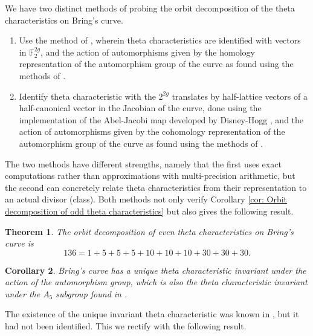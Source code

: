 \documentclass{amsart}
\newtheorem{theorem}{Theorem}[section]
\newtheorem{corollary}[theorem]{Corollary}
\begin{document}
We have two distinct methods of probing the orbit decomposition of the theta characteristics on Bring's curve.
\begin{enumerate}
    \item Use the method of \cite{Kallel2006}, wherein theta characteristics are identified with vectors in $\mathbb{F}_2^{2g}$, and the action of automorphisms given by the homology representation of the automorphism group of the curve as found using the methods of \cite{Bruin2019}. 
    \item Identify theta characteristic with the $2^{2g}$ translates by half-lattice vectors of a half-canonical vector in the Jacobian of the curve, done using the implementation of the Abel-Jacobi map developed by Disney-Hogg \cite{DisneyHogg2021}, and the action of automorphisms given by the cohomology representation of the automorphism group of the curve as found using the methods of \cite{Bruin2019}.
\end{enumerate}
The two methods have different strengths, namely that the first uses exact computations rather than approximations with multi-precision arithmetic, but the second can concretely relate theta characteristics from their representation to an actual divisor (class). Both methods not only verify Corollary \ref{cor: Orbit decomposition of odd theta characteristics} but also gives the following result. 
\begin{theorem}
The orbit decomposition of even theta characteristics on Bring's curve is 
\begin{equation}\label{eq:evencharacteristics}
136 = 1 + 5+5+5+10+10+10+30+30+30  . 
\end{equation}
\end{theorem}
\begin{corollary}
Bring's curve has a unique theta characteristic invariant under the action of the automorphism group, which is also the theta characteristic invariant under the $A_5$ subgroup found in \cite{Burns1983}.
\end{corollary}

The existence of the unique invariant theta characteristic was known in \cite{Braden2012}, but it had not been identified. This we rectify with the following result. 
\end{document}
